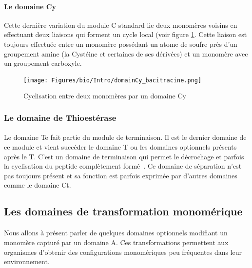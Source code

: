 \documentclass[12pt,french,twoside]{report}
\begin{document}
\paragraph{Le domaine Cy}
\label{Cy}
Cette dernière variation du module C standard lie deux monomères voisins en effectuant deux liaisons qui forment un cycle local (voir figure \ref{domaine_Cy}.
Cette liaison est toujours effectuée entre un monomère possédant un atome de soufre près d'un groupement amine (la Cystéine et certaines de ses dérivées) et un monomère avec un groupement carboxyle.

\begin{figure}[h!]
  \begin{center}
    \texttt{[image: Figures/bio/Intro/domainCy\_bacitracine.png]}
    \caption{\label{domaine_Cy}Cyclisation entre deux monomères par un domaine Cy}
  \end{center}
\end{figure}


\subsubsection{Le domaine de Thioestérase}

\paragraph{}Le domaine Te fait partie du module de terminaison.
Il est le dernier domaine de ce module et vient succéder le domaine T ou les domaines optionnels présents après le T.
C'est un domaine de terminaison qui permet le décrochage et parfois la cyclisation du peptide complètement formé~\cite{trauger_peptide_2000,kohli_thioesterase_2002}.
Ce domaine de séparation n'est pas toujours présent et sa fonction est parfois exprimée par d'autres domaines comme le domaine Ct.


\subsection{Les domaines de transformation monomérique}

\paragraph{}Nous allons à présent parler de quelques domaines optionnels modifiant un monomère capturé par un domaine A.
Ces transformations permettent aux organismes d'obtenir des configurations monomériques peu fréquentes dans leur environnement.
\end{document}
